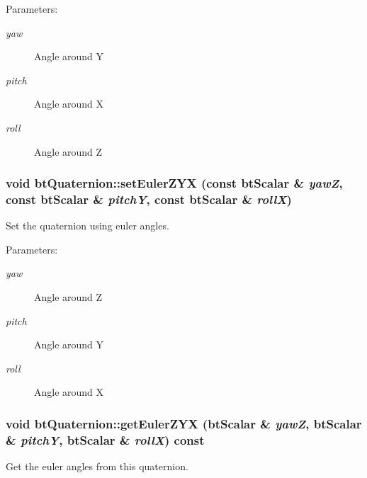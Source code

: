\begin{Desc}
\item[Parameters:]
\begin{description}
\item[{\em yaw}]Angle around Y \item[{\em pitch}]Angle around X \item[{\em roll}]Angle around Z \end{description}
\end{Desc}
\hypertarget{classbt_quaternion_df15384cff65f630b0537f1b8aeee622}{
\subsubsection[setEulerZYX]{\setlength{\rightskip}{0pt plus 5cm}void btQuaternion::setEulerZYX (const btScalar \& {\em yawZ}, \/  const btScalar \& {\em pitchY}, \/  const btScalar \& {\em rollX})}}
\label{classbt_quaternion_df15384cff65f630b0537f1b8aeee622}


Set the quaternion using euler angles. 

\begin{Desc}
\item[Parameters:]
\begin{description}
\item[{\em yaw}]Angle around Z \item[{\em pitch}]Angle around Y \item[{\em roll}]Angle around X \end{description}
\end{Desc}
\hypertarget{classbt_quaternion_9aef6f3c621a0a8493d1545c7043f075}{
\subsubsection[getEulerZYX]{\setlength{\rightskip}{0pt plus 5cm}void btQuaternion::getEulerZYX (btScalar \& {\em yawZ}, \/  btScalar \& {\em pitchY}, \/  btScalar \& {\em rollX}) const}}
\label{classbt_quaternion_9aef6f3c621a0a8493d1545c7043f075}


Get the euler angles from this quaternion. 

